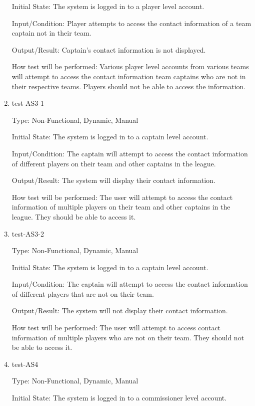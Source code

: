 \documentclass[12pt, titlepage]{article}
\begin{document}
\begin{enumerate}
  Initial State: The system is logged in to a player level account.

  Input/Condition: Player attempts to access the contact information of a 
  team captain not in their team.

  Output/Result: Captain's contact information is not displayed.

  How test will be performed: Various player level accounts from various teams 
  will attempt to access the contact information team captains who are not 
  in their respective teams. Players should not be able to access the information.

  \item{test-AS3-1\\}

  Type: Non-Functional, Dynamic, Manual

  Initial State: The system is logged in to a captain level account.

  Input/Condition: The captain will attempt to access the contact information
  of different players on their team and other captains in the league.

  Output/Result: The system will display their contact information.

  How test will be performed: The user will attempt to access the contact
  information of multiple players on their team and other captains in the
  league. They should be able to access it.

  \item{test-AS3-2\\}

  Type: Non-Functional, Dynamic, Manual

  Initial State: The system is logged in to a captain level account.

  Input/Condition: The captain will attempt to access the contact information
  of different players that are not on their team.

  Output/Result: The system will not display their contact information.

  How test will be performed: The user will attempt to access contact
  information of multiple players who are not on their team. They should not
  be able to access it.

  \item{test-AS4\\}

  Type: Non-Functional, Dynamic, Manual

  Initial State: The system is logged in to a commissioner level account.


\end{enumerate}
\end{document}
